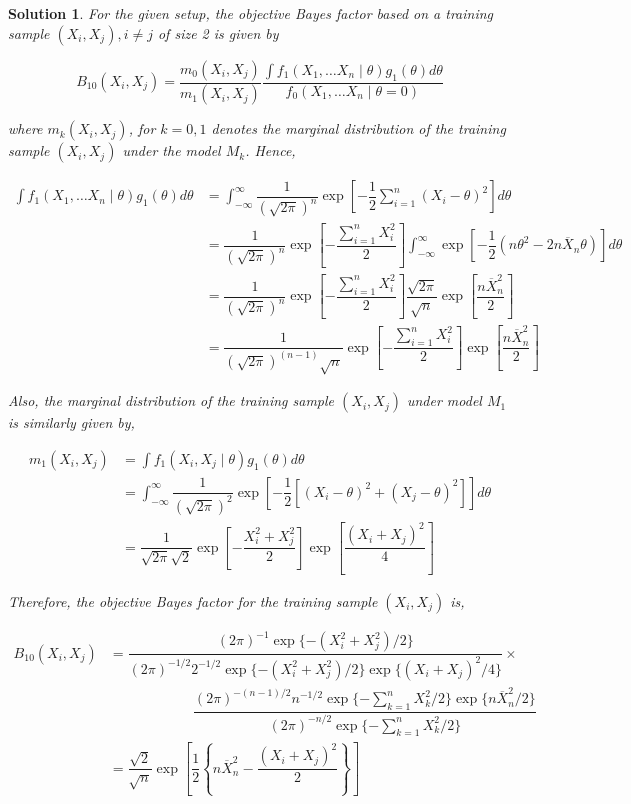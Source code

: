 \documentclass[12pt]{article}
\theoremstyle{problemstyle}
\newtheorem*{solution*}{Solution}
\begin{document}
\begin{solution*}
    For the given setup, the objective Bayes factor based on a training sample $(X_i, X_j), i\neq j$ of size 2 is given by 

    $$
    B_{10}(X_i, X_j) = \dfrac{m_{0}(X_i, X_j)}{m_{1}(X_i, X_j)} \dfrac{\int f_1(X_1, \dots X_n \mid \theta) g_1(\theta)d\theta}{f_0(X_1, \dots X_n \mid \theta = 0)}
    $$

    \noindent where $m_k(X_i, X_j)$, for $k = 0, 1$ denotes the marginal distribution of the training sample $(X_i, X_j)$ under the model $M_k$. Hence,

    \begin{align*}
        \int f_1(X_1, \dots X_n \mid \theta) g_1(\theta)d\theta
        & = \int_{-\infty}^\infty \dfrac{1}{(\sqrt{2\pi})^n} \exp\left[ -\dfrac{1}{2}\sum_{i=1}^n (X_i - \theta)^2 \right] d\theta\\
        & = \dfrac{1}{(\sqrt{2\pi})^n} \exp\left[ -\dfrac{\sum_{i=1}^n X_i^2}{2} \right] \int_{-\infty}^\infty \exp\left[ -\dfrac{1}{2}(n\theta^2 - 2n\overline{X}_n \theta) \right]d\theta\\
        & = \dfrac{1}{(\sqrt{2\pi})^n} \exp\left[ -\dfrac{\sum_{i=1}^n X_i^2}{2} \right] \dfrac{\sqrt{2\pi}}{\sqrt{n}} \exp\left[ \dfrac{n\overline{X}_n^2}{2} \right]\\
        & = \dfrac{1}{(\sqrt{2\pi})^{(n-1)}\sqrt{n}} \exp\left[ -\dfrac{\sum_{i=1}^n X_i^2}{2} \right] \exp\left[ \dfrac{n\overline{X}_n^2}{2} \right]
    \end{align*}

    Also, the marginal distribution of the training sample $(X_i, X_j)$ under model $M_1$ is similarly given by,

    \begin{align*}
        m_1(X_i, X_j)
        & = \int f_1(X_i, X_j \mid \theta) g_1(\theta)d\theta\\
        & = \int_{-\infty}^\infty \dfrac{1}{(\sqrt{2\pi})^2} \exp\left[ -\dfrac{1}{2} [(X_i - \theta)^2 + (X_j - \theta)^2] \right] d\theta\\
        & = \dfrac{1}{\sqrt{2\pi}\sqrt{2}} \exp\left[ -\dfrac{X_i^2 + X_j^2}{2} \right] \exp\left[ \dfrac{(X_i + X_j)^2}{4} \right]
    \end{align*}

    Therefore, the objective Bayes factor for the training sample $(X_i, X_j)$ is,

    \begingroup 
    \allowdisplaybreaks
    \begin{align*}
        B_{10}(X_i, X_j) 
        & = \dfrac{(2\pi)^{-1} \exp\{-(X_i^2 + X_j^2)/2\}}{(2\pi)^{-1/2} 2^{-1/2} \exp\{-(X_i^2 + X_j^2)/2\} \exp\{ (X_i + X_j)^2/4 \} } \times \\
        & \qquad \qquad \qquad \dfrac{(2\pi)^{-(n-1)/2}n^{-1/2} \exp\{ -\sum_{k=1}^n X_k^2/2 \} \exp\{ n\overline{X}_n^2 / 2\} }{(2\pi)^{-n/2} \exp\{  -\sum_{k=1}^n X_k^2/2 \} }\\
        & = \dfrac{\sqrt{2}}{\sqrt{n}} \exp\left[ \dfrac{1}{2} \left\{ n\overline{X}_n^2 - \dfrac{(X_i + X_j)^2}{2} \right\}\right]
    \end{align*}
    \endgroup


\end{solution*}
\end{document}
